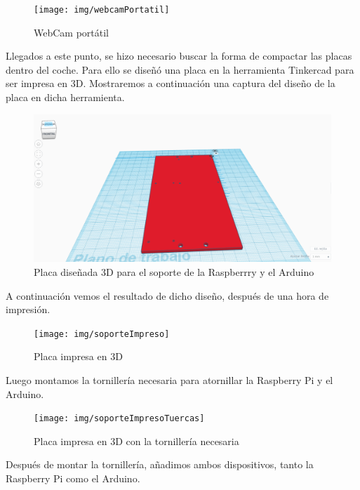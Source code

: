 \documentclass{pclass}
\begin{document}
\begin{itemize}
\begin{figure}[H]
	\centering
	\texttt{[image: img/webcamPortatil]}
	\caption{WebCam portátil}
	\label{fig:webcamportatil}
\end{figure}

Llegados a este punto, se hizo necesario buscar la forma de compactar las placas dentro del coche. Para ello se diseñó una placa en la herramienta Tinkercad para ser impresa en 3D. Mostraremos a continuación una captura del diseño de la placa en dicha herramienta.

\begin{figure}[H]
	\centering
	\includegraphics[width=1\textwidth]{img/soportePlacas}
	\caption{Placa diseñada 3D para el soporte de la Raspberrry y el Arduino}
	\label{fig:soporteplacas}
\end{figure}

\clearpage
A continuación vemos el resultado de dicho diseño, después de una hora de impresión.

\begin{figure}[H]
	\centering
	\texttt{[image: img/soporteImpreso]}
	\caption{Placa impresa en 3D}
	\label{fig:soporteplacasimpreso}
\end{figure}

\clearpage
Luego montamos la tornillería necesaria para atornillar la Raspberry Pi y el Arduino.

\begin{figure}[H]
	\centering
	\texttt{[image: img/soporteImpresoTuercas]}
	\caption{Placa impresa en 3D con la tornillería necesaria}
	\label{fig:soporteplacasimpresotuercas}
\end{figure}

Después de montar la tornillería, añadimos ambos dispositivos, tanto la Raspberry Pi como el Arduino.


\end{itemize}
\end{document}
